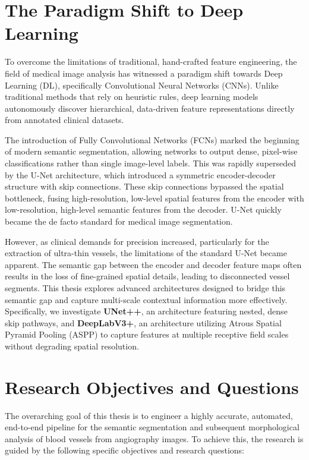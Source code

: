 \section{The Paradigm Shift to Deep Learning}
To overcome the limitations of traditional, hand-crafted feature engineering, the field of medical image analysis has witnessed a paradigm shift towards Deep Learning (DL), specifically Convolutional Neural Networks (CNNs). Unlike traditional methods that rely on heuristic rules, deep learning models autonomously discover hierarchical, data-driven feature representations directly from annotated clinical datasets. 

The introduction of Fully Convolutional Networks (FCNs) marked the beginning of modern semantic segmentation, allowing networks to output dense, pixel-wise classifications rather than single image-level labels. This was rapidly superseded by the U-Net architecture, which introduced a symmetric encoder-decoder structure with skip connections. These skip connections bypassed the spatial bottleneck, fusing high-resolution, low-level spatial features from the encoder with low-resolution, high-level semantic features from the decoder. U-Net quickly became the de facto standard for medical image segmentation.

However, as clinical demands for precision increased, particularly for the extraction of ultra-thin vessels, the limitations of the standard U-Net became apparent. The semantic gap between the encoder and decoder feature maps often results in the loss of fine-grained spatial details, leading to disconnected vessel segments. This thesis explores advanced architectures designed to bridge this semantic gap and capture multi-scale contextual information more effectively. Specifically, we investigate \textbf{UNet++}, an architecture featuring nested, dense skip pathways, and \textbf{DeepLabV3+}, an architecture utilizing Atrous Spatial Pyramid Pooling (ASPP) to capture features at multiple receptive field scales without degrading spatial resolution.

\section{Research Objectives and Questions}
The overarching goal of this thesis is to engineer a highly accurate, automated, end-to-end pipeline for the semantic segmentation and subsequent morphological analysis of blood vessels from angiography images. To achieve this, the research is guided by the following specific objectives and research questions:

